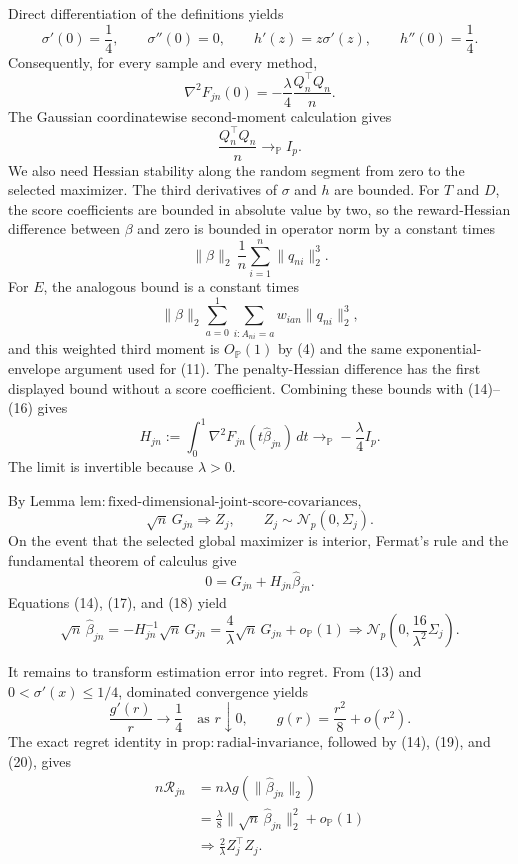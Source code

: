 Direct differentiation of the definitions yields
\[
 \sigma'(0)=\frac14,
 \qquad \sigma''(0)=0,
 \qquad h'(z)=z\sigma'(z),
 \qquad h''(0)=\frac14.
\]
Consequently, for every sample and every method,
\[
 \nabla^2F_{jn}(0)
 =-\frac{\lambda}{4}\frac{Q_n^\top Q_n}{n}.
 \tag{15}
\]
The Gaussian coordinatewise second-moment calculation gives
\[
 \frac{Q_n^\top Q_n}{n}\longrightarrow_{\mathbb P}I_p.
 \tag{16}
\]
We also need Hessian stability along the random segment from zero to the
selected maximizer.  The third derivatives of \(\sigma\) and \(h\) are
bounded.  For \(T\) and \(D\), the score coefficients are bounded in
absolute value by two, so the reward-Hessian difference between \(\beta\)
and zero is bounded in operator norm by a constant times
\[
 \|\beta\|_2\,\frac1n\sum_{i=1}^n\|q_{ni}\|_2^3.
\]
For \(E\), the analogous bound is a constant times
\[
 \|\beta\|_2
 \sum_{a=0}^1\sum_{i:A_{ni}=a}w_{ian}\|q_{ni}\|_2^3,
\]
and this weighted third moment is \(O_{\mathbb P}(1)\) by (4) and the same
exponential-envelope argument used for (11).  The penalty-Hessian difference
has the first displayed bound without a score coefficient.  Combining these
bounds with (14)--(16) gives
\[
 H_{jn}:=\int_0^1\nabla^2F_{jn}(t\widehat\beta_{jn})\,dt
 \longrightarrow_{\mathbb P}-\frac{\lambda}{4}I_p.
 \tag{17}
\]
The limit is invertible because \(\lambda>0\).

By Lemma
\(\mathrm{lem{:}fixed\mbox{-}dimensional\mbox{-}joint\mbox{-}score\mbox{-}covariances}\),
\[
 \sqrt n\,G_{jn}\Rightarrow Z_j,
 \qquad Z_j\sim\mathcal N_p(0,\Sigma_j).
 \tag{18}
\]
On the event that the selected global maximizer is interior, Fermat's rule
and the fundamental theorem of calculus give
\[
 0=G_{jn}+H_{jn}\widehat\beta_{jn}.
\]
Equations (14), (17), and (18) yield
\[
 \sqrt n\,\widehat\beta_{jn}
 =-H_{jn}^{-1}\sqrt n\,G_{jn}
 =\frac4\lambda\sqrt n\,G_{jn}+o_{\mathbb P}(1)
 \Rightarrow
 \mathcal N_p\!\left(0,\frac{16}{\lambda^2}\Sigma_j\right).
 \tag{19}
\]

It remains to transform estimation error into regret.  From (13) and
\(0<\sigma'(x)\le1/4\), dominated convergence yields
\[
 \frac{g'(r)}r\longrightarrow\frac14
 \quad\text{as }r\downarrow0,
 \qquad
 g(r)=\frac{r^2}{8}+o(r^2).
 \tag{20}
\]
The exact regret identity in
\(\mathrm{prop{:}radial\mbox{-}invariance}\), followed by (14), (19), and
(20), gives
\[
 \begin{aligned}
 n\mathcal R_{jn}
 &=n\lambda g(\|\widehat\beta_{jn}\|_2)\\
 &=\frac{\lambda}{8}\|\sqrt n\,\widehat\beta_{jn}\|_2^2
   +o_{\mathbb P}(1)\\
 &\Rightarrow \frac2\lambda Z_j^\top Z_j.
 \end{aligned}
 \tag{21}
\]

